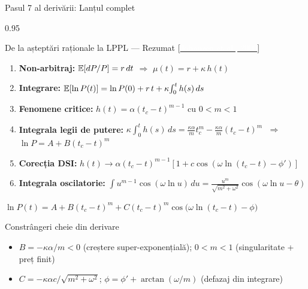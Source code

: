 \documentclass[9pt, aspectratio=169, t]{beamer}
\begin{document}
\begin{frame}{Pasul 7 al derivării: Lanțul complet}
    \begin{cminipage}{0.95\textwidth}
    {\scriptsize
    \begin{block}{De la așteptări raționale la LPPL --- Rezumat {\scriptsize[\href{https://doi.org/10.48550/arXiv.cond-mat/9903321}{\textcolor{white}{Johansen et al., 2000}}]}}
        \begin{enumerate}\setlength{\itemsep}{0pt}
            \item \textbf{Non-arbitraj:} $\mathbb{E}[dP/P] = r\,dt$ $\Longrightarrow$ $\mu(t) = r + \kappa\,h(t)$
            \item \textbf{Integrare:} $\mathbb{E}[\ln P(t)] = \ln P(0) + r\,t + \kappa\!\int_0^t h(s)\,ds$
            \item \textbf{Fenomene critice:} $h(t) = \alpha(t_c - t)^{m-1}$ cu $0 < m < 1$
            \item \textbf{Integrala legii de putere:} $\kappa\!\int_0^t h(s)\,ds = \tfrac{\kappa\alpha}{m}t_c^m - \tfrac{\kappa\alpha}{m}(t_c - t)^m$ $\;\Rightarrow\;$ $\ln P = A + B(t_c-t)^m$
            \item \textbf{Corecția DSI:} $h(t) \to \alpha(t_c{-}t)^{m-1}[1 + c\cos(\omega\ln(t_c{-}t) {-} \phi')]$
            \item \textbf{Integrala oscilatorie:} $\int u^{m-1}\cos(\omega\ln u)\,du = \frac{u^m}{\sqrt{m^2+\omega^2}}\cos(\omega\ln u - \theta)$
        \end{enumerate}
    \end{block}
    \vspace{-2mm}
    \begin{exampleblock}{}
        \vspace{-1mm}
        \begin{center}
            \large $\boxed{\ln P(t) = A + B(t_c - t)^m + C(t_c - t)^m \cos\bigl(\omega \ln(t_c - t) - \phi\bigr)}$
        \end{center}
        \vspace{-2mm}
    \end{exampleblock}
    \vspace{-2mm}
    \begin{alertblock}{Constrângeri cheie din derivare}
        \begin{itemize}\setlength{\itemsep}{0pt}
            \item $B = -\kappa\alpha/m < 0$ (creștere super-exponențială); \; $0 < m < 1$ (singularitate + preț finit)
            \item $C = -\kappa\alpha c/\sqrt{m^2{+}\omega^2}$; \; $\phi = \phi' + \arctan(\omega/m)$ (defazaj din integrare)
        \end{itemize}
    \end{alertblock}
    }
    \end{cminipage}
\end{frame}
\end{document}
